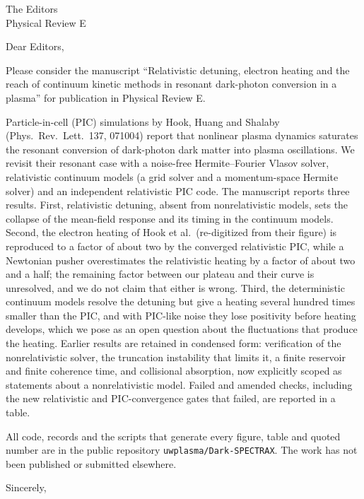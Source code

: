 \documentclass[11pt]{letter}
\begin{document}
\begin{letter}{The Editors\\Physical Review E}
\opening{Dear Editors,}
Please consider the manuscript ``Relativistic detuning, electron heating and the reach of continuum kinetic methods in resonant dark-photon conversion in a plasma'' for publication in Physical Review E.

Particle-in-cell (PIC) simulations by Hook, Huang and Shalaby (Phys.\ Rev.\ Lett.\ 137, 071004) report that nonlinear plasma dynamics saturates the resonant conversion of dark-photon dark matter into plasma oscillations. We revisit their resonant case with a noise-free Hermite--Fourier Vlasov solver, relativistic continuum models (a grid solver and a momentum-space Hermite solver) and an independent relativistic PIC code. The manuscript reports three results. First, relativistic detuning, absent from nonrelativistic models, sets the collapse of the mean-field response and its timing in the continuum models. Second, the electron heating of Hook et al.\ (re-digitized from their figure) is reproduced to a factor of about two by the converged relativistic PIC, while a Newtonian pusher overestimates the relativistic heating by a factor of about two and a half; the remaining factor between our plateau and their curve is unresolved, and we do not claim that either is wrong. Third, the deterministic continuum models resolve the detuning but give a heating several hundred times smaller than the PIC, and with PIC-like noise they lose positivity before heating develops, which we pose as an open question about the fluctuations that produce the heating. Earlier results are retained in condensed form: verification of the nonrelativistic solver, the truncation instability that limits it, a finite reservoir and finite coherence time, and collisional absorption, now explicitly scoped as statements about a nonrelativistic model. Failed and amended checks, including the new relativistic and PIC-convergence gates that failed, are reported in a table.

All code, records and the scripts that generate every figure, table and quoted number are in the public repository \texttt{uwplasma/Dark-SPECTRAX}. The work has not been published or submitted elsewhere.

\closing{Sincerely,}
\end{letter}
\end{document}
